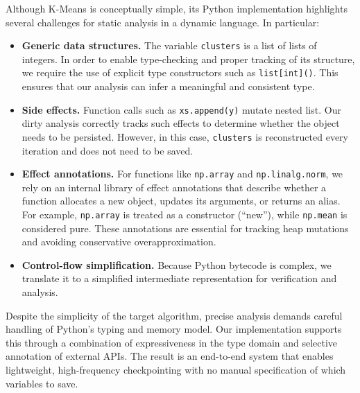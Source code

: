 Although K-Means is conceptually simple, its Python implementation highlights several challenges for static analysis in a dynamic language. In particular:
\begin{itemize}
    \item \textbf{Generic data structures.} The variable \texttt{clusters} is a list of lists of integers. In order to enable type-checking and proper tracking of its structure, we require the use of explicit type constructors such as \texttt{list[int]()}. This ensures that our analysis can infer a meaningful and consistent type.
    \item \textbf{Side effects.} Function calls such as \texttt{xs.append(y)} mutate nested list. Our dirty analysis correctly tracks such effects to determine whether the object needs to be persisted. However, in this case, \texttt{clusters} is reconstructed every iteration and does not need to be saved.
    \item \textbf{Effect annotations.} For functions like \texttt{np.array} and \texttt{np.linalg.norm}, we rely on an internal library of effect annotations that describe whether a function allocates a new object, updates its arguments, or returns an alias. For example, \texttt{np.array} is treated as a constructor (``new''), while \texttt{np.mean} is considered pure. These annotations are essential for tracking heap mutations and avoiding conservative overapproximation.
    \item \textbf{Control-flow simplification.} Because Python bytecode is complex, we translate it to a simplified intermediate representation for verification and analysis.
\end{itemize}

Despite the simplicity of the target algorithm, precise analysis demands careful handling of Python's typing and memory model. Our implementation supports this through a combination of expressiveness in the type domain and selective annotation of external APIs. The result is an end-to-end system that enables lightweight, high-frequency checkpointing with no manual specification of which variables to save.
